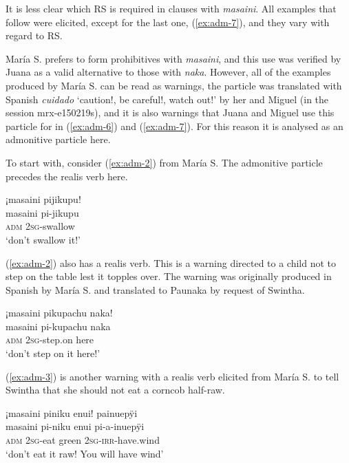 It is less clear which RS is required in clauses with \textit{masaini}.  All examples that follow were elicited, except for the last one, (\ref{ex:adm-7}), and they vary with regard to RS. 

María S. prefers to form prohibitives with \textit{masaini}, and this use was verified by Juana as a valid alternative to those with \textit{naka}. However, all of the examples produced by María S. can be read as warnings, the particle was translated with Spanish \textit{cuidado} ‘caution!, be careful!, watch out!’  by her and Miguel (in the session mrx-e150219s), and it is also warnings that Juana and Miguel use this particle for in (\ref{ex:adm-6}) and (\ref{ex:adm-7}). For this reason it is analysed as an admonitive particle here.

To start with, consider (\ref{ex:adm-2}) from María S. The admonitive particle precedes the realis verb here.

\ea\label{ex:adm-2}
\begingl
\glpreamble ¡masaini pijikupu!\\
\gla masaini pi-jikupu\\
\glb \textsc{adm} 2\textsc{sg}-swallow\\
\glft ‘don’t swallow it!’\\%
\endgl
\trailingcitation{[rxx-e141230s.076]}
\xe

(\ref{ex:adm-2}) also has a realis verb. This is a warning directed to a child not to step on the table lest it topples over. The warning was originally produced in Spanish by María S. and translated to Paunaka by request of Swintha.

\ea\label{ex:adm-1}
\begingl 
\glpreamble ¡masaini pikupachu naka!\\
\gla masaini pi-kupachu naka\\ 
\glb \textsc{adm} 2\textsc{sg}-step.on here\\ 
\glft ‘don’t step on it here!’
\trailingcitation{[mrx-e150219s.150]}
\xe

(\ref{ex:adm-3}) is another warning with a realis verb elicited from María S. to tell Swintha that she should not eat a corncob half-raw.

\ea\label{ex:adm-3}
\begingl
\glpreamble ¡masaini piniku enui! painuepÿi\\
\gla masaini pi-niku enui pi-a-inuepÿi\\
\glb \textsc{adm} 2\textsc{sg}-eat green 2\textsc{sg}-\textsc{irr}-have.wind\\
\glft ‘don’t eat it raw! You will have wind’
\endgl
\trailingcitation{[rxx-e150220s-1.25]}
\xe

